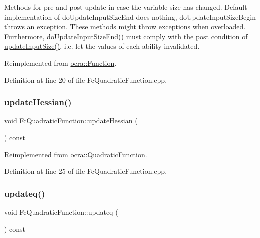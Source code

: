 Methods for pre and post update in case the variable size has changed. Default implementation of do\+Update\+Input\+Size\+End does nothing, do\+Update\+Input\+Size\+Begin throws an exception. These methods might throw exceptions when overloaded. Furthermore, {\ttfamily \hyperlink{classocra_1_1QuadraticFunction_ab3d5478fd8ded343453e0489c595e580}{do\+Update\+Input\+Size\+End()}} must comply with the post condition of {\ttfamily \hyperlink{classocra_1_1Function_a3a5b9e6ae296339acc87ab2cbf97ef98}{update\+Input\+Size()}}, i.\+e. let the values of each ability invalidated. 

Reimplemented from \hyperlink{classocra_1_1Function_a3f728f3758e6448aa59932853db5ddcc}{ocra\+::\+Function}.



Definition at line 20 of file Fc\+Quadratic\+Function.\+cpp.

\hypertarget{classocra_1_1FcQuadraticFunction_aef068bc86027f29c0fbfaa9d53441cd4}{}\label{classocra_1_1FcQuadraticFunction_aef068bc86027f29c0fbfaa9d53441cd4} 
\subsubsection{\texorpdfstring{update\+Hessian()}{updateHessian()}}
{\footnotesize\ttfamily void Fc\+Quadratic\+Function\+::update\+Hessian (\begin{DoxyParamCaption}{ }\end{DoxyParamCaption}) const\hspace{0.3cm}{\ttfamily [virtual]}}



Reimplemented from \hyperlink{classocra_1_1QuadraticFunction_a342ea525685ddc2c414a49e7480a7a4c}{ocra\+::\+Quadratic\+Function}.



Definition at line 25 of file Fc\+Quadratic\+Function.\+cpp.

\hypertarget{classocra_1_1FcQuadraticFunction_ac6bcfaccbe16a821e0f1d7c29744d138}{}\label{classocra_1_1FcQuadraticFunction_ac6bcfaccbe16a821e0f1d7c29744d138} 
\subsubsection{\texorpdfstring{updateq()}{updateq()}}
{\footnotesize\ttfamily void Fc\+Quadratic\+Function\+::updateq (\begin{DoxyParamCaption}{ }\end{DoxyParamCaption}) const\hspace{0.3cm}{\ttfamily [virtual]}}



